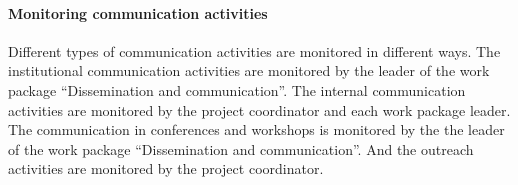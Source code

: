 \paragraph*{Monitoring communication activities}

Different types of communication activities are monitored in
different ways.  The institutional communication activities are
monitored by the leader of the work package ``Dissemination and
communication''. The internal communication activities are monitored
by the project coordinator and each work package leader. The communication
in conferences and workshops is monitored by the
the leader of the work package ``Dissemination and
communication''. And the outreach activities are monitored by the
project coordinator.

